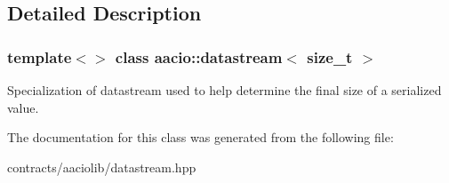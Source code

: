 \subsection{Detailed Description}
\subsubsection*{template$<$$>$\newline
class aacio\+::datastream$<$ size\+\_\+t $>$}

Specialization of datastream used to help determine the final size of a serialized value. 

The documentation for this class was generated from the following file\+:\begin{DoxyCompactItemize}
\item 
contracts/aaciolib/datastream.\+hpp\end{DoxyCompactItemize}
